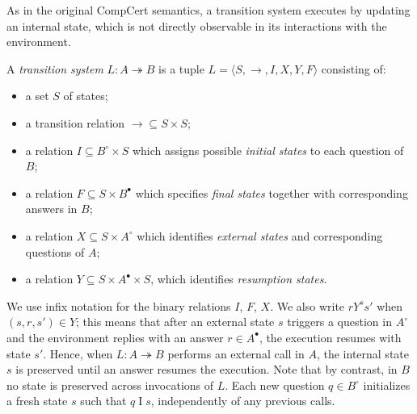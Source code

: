 \documentclass[acmsmall,screen,review,anonymous]{acmart}
\newcommand{\que}{\circ}
\newcommand{\ans}{\bullet}
\begin{document}

As in the original CompCert semantics,
a transition system
executes by updating an internal state,
which is not directly observable
in its interactions with the environment.

\begin{definition} \label{def:lts} %
A \emph{transition system} $L : A \twoheadrightarrow B$
is a tuple $L = \langle S, {\rightarrow}, I, X, Y, F \rangle$
consisting of:
\begin{itemize}
  \item a set $S$ of states;
  \item a transition relation ${\rightarrow} \subseteq S \times S$;
  \item a relation $I \subseteq B^\que \times S$
    which assigns possible \emph{initial states}
    to each question of $B$;
  \item a relation $F \subseteq S \times B^\ans$
    which specifies \emph{final states} together with
    corresponding answers in $B$;
  \item a relation $X \subseteq S \times A^\que$
    which identifies \emph{external states} and
    corresponding questions of $A$;
  \item a relation $Y \subseteq S \times A^\ans \times S$,
    which identifies \emph{resumption states}.
\end{itemize}
\end{definition}

We use infix notation for the binary relations $I$, $F$, $X$.
We also write $r \mathrel{Y^s} s'$ when $(s, r, s') \in Y$;
this means that
after an external state $s$ triggers a question in $A^\que$ %
and the environment replies with an answer $r \in A^\ans$,
the execution resumes with state $s'$.
Hence,
when $L : A \twoheadrightarrow B$
performs an external call in $A$,
the internal state $s$ is preserved
until an answer resumes the execution.
Note that by contrast, in $B$
no state is preserved across invocations of $L$.
Each new question $q \in B^\que$ initializes a fresh state $s$
such that $q \mathrel{I} s$,
independently of any previous calls. %
\end{document}
